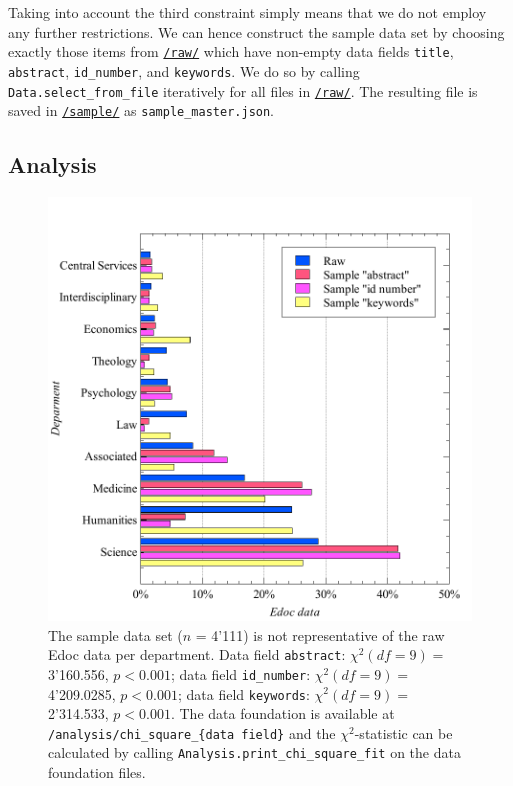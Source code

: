 Taking into account the third constraint simply means that we do not
employ any further restrictions. We can hence construct the sample data
set by choosing exactly those items from
\href{https://github.com/MHindermann/mas/tree/main/files/raw}{\texttt{/raw/}}
which have non-empty data fields \texttt{title}, \texttt{abstract},
\texttt{id\_number}, and \texttt{keywords}. We do so by calling
\texttt{Data.select\_from\_file} iteratively for all files in
\href{https://github.com/MHindermann/mas/tree/main/files/raw}{\texttt{/raw/}}.
The resulting file is saved in
\href{https://github.com/MHindermann/mas/tree/main/files/sample}{\texttt{/sample/}}
as \texttt{sample\_master.json}.

\hypertarget{analysis}{%
\subsection{Analysis}\label{analysis}}

\begin{figure}
\centering
\includegraphics{images/chi_square_selection_fields.pdf}
\caption{The sample data set (\(n\) = 4'111) is not representative of
the raw Edoc data per department. Data field \texttt{abstract}:
\(\chi^2 (df=9) =\) 3'160.556, \(p < 0.001\); data field
\texttt{id\_number}: \(\chi^2 (df=9) =\) 4'209.0285, \(p < 0.001\); data
field \texttt{keywords}: \(\chi^2 (df=9) =\) 2'314.533, \(p < 0.001\).
The data foundation is available at
\texttt{/analysis/chi\_square\_\{data\ field\}} and the
\(\chi^2\)-statistic can be calculated by calling
\texttt{Analysis.print\_chi\_square\_fit} on the data foundation files.}
\end{figure}

